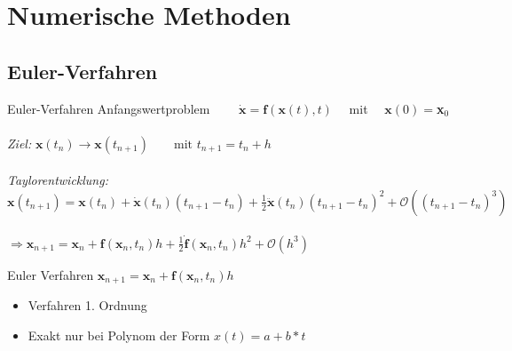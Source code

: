 \documentclass{beamer}
\begin{document}
\section{Numerische Methoden}
\subsection{Euler-Verfahren}
	\begin{frame}{Euler-Verfahren}
		Anfangswertproblem $\qquad \dot{\textbf{x}}=\textbf{f}(\textbf{x}(t),t) \quad$ mit $\quad  \textbf{x}(0)=$\textbf{x}$_0$\\~\\
		\textit{Ziel:} $\textbf{x}(t_n)\rightarrow\textbf{x}(t_{n+1})\qquad \textrm{mit } t_{n+1}=t_n+h$\\~\\
		\pause
		\textit{Taylorentwicklung:} $\textbf{x}(t_{n+1})=\textbf{x}(t_n)+\dot{\textbf{x}}(t_n)(t_{n+1}-t_n)+\frac{1}{2}\ddot{\textbf{x}}(t_n)(t_{n+1}-t_n)^2+{\mathcal O}((t_{n+1}-t_n)^3)$\\~\\
		\pause
		$\Rightarrow \textbf{x}_{n+1}=\textbf{x}_n+\textbf{f}(\textbf{x}_n,t_n)h+\frac{1}{2}\dot{\textbf{f}}(\textbf{x}_n,t_n)h^2+{\mathcal O}(h^3)$\\
		\pause
		\begin{block}{Euler Verfahren}
		\hspace{3cm}$\textbf{x}_{n+1}=\textbf{x}_n+\textbf{f}(\textbf{x}_n,t_n)h$
		\begin{itemize}
		\item Verfahren 1. Ordnung
		\item Exakt nur bei Polynom der Form $x(t)=a+b*t$
		\end{itemize}
		\end{block}
		 
	\end{frame}
	
\end{document}
